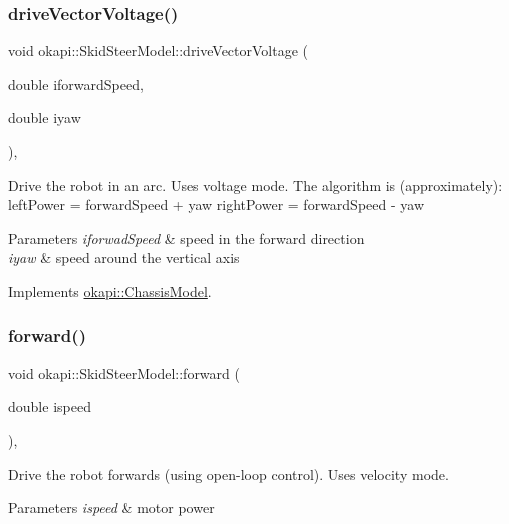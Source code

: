 \subsubsection{\texorpdfstring{driveVectorVoltage()}{driveVectorVoltage()}}
{\footnotesize\ttfamily void okapi\+::\+Skid\+Steer\+Model\+::drive\+Vector\+Voltage (\begin{DoxyParamCaption}\item[{double}]{iforward\+Speed,  }\item[{double}]{iyaw }\end{DoxyParamCaption})\hspace{0.3cm}{\ttfamily [override]}, {\ttfamily [virtual]}}

Drive the robot in an arc. Uses voltage mode. The algorithm is (approximately)\+: left\+Power = forward\+Speed + yaw right\+Power = forward\+Speed -\/ yaw


\begin{DoxyParams}{Parameters}
{\em iforwad\+Speed} & speed in the forward direction \\
\hline
{\em iyaw} & speed around the vertical axis \\
\hline
\end{DoxyParams}


Implements \mbox{\hyperlink{classokapi_1_1ChassisModel_a69115758be9e29888dce34f317d57150}{okapi\+::\+Chassis\+Model}}.

\mbox{\label{classokapi_1_1SkidSteerModel_a74ca9d9f1b0f80c9453194567c58e967}} 
\subsubsection{\texorpdfstring{forward()}{forward()}}
{\footnotesize\ttfamily void okapi\+::\+Skid\+Steer\+Model\+::forward (\begin{DoxyParamCaption}\item[{double}]{ispeed }\end{DoxyParamCaption})\hspace{0.3cm}{\ttfamily [override]}, {\ttfamily [virtual]}}

Drive the robot forwards (using open-\/loop control). Uses velocity mode.


\begin{DoxyParams}{Parameters}
{\em ispeed} & motor power \\
\hline
\end{DoxyParams}


